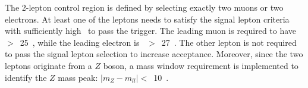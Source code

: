 \par The 2-lepton control region is defined by selecting exactly two muons or two electrons. 
At least one of the leptons needs to satisfy the signal lepton criteria with sufficiently high \pt~to pass the trigger. 
The leading muon is required to have \pt~$>$~25~\GeV, while the leading electron is \pt~$>$~27~\GeV. 
The other lepton is not required to pass the signal lepton selection to increase acceptance. 
Moreover, since the two leptons originate from a $Z$ boson, a mass window requirement is implemented to identify the $Z$ mass peak: $|m_{Z}-m_{ll}|<$~10~\GeV.
